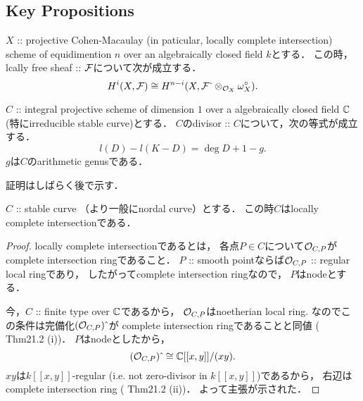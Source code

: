 \documentclass[a4paper]{jsarticle}
\newcommand{\dualsh}{\omega^{\circ}}
\begin{document}
    \subsection{Key Propositions}
    \begin{Thm} \label{thm:Hi_iso_Hn-i}
        $X$ :: projective Cohen-Macaulay (in paticular, locally complete intersection)
        scheme of equidimention $n$
        over an algebraically closed field $k$とする．
        この時，lcally free sheaf :: $\mathcal{F}$について次が成立する．
        \[ H^i(X, \shF) \iso H^{n-i}(X, \shF \sidecheck \otimes_{\shO_X} \dualsh_X). \]
    \end{Thm}

    \begin{Thm} \label{thm:RRforSingCurve}
        $C$ :: integral projective scheme of dimension $1$
        over a algebraically closed field $\mathbb{C}$
        (特にirreducible stable curve)とする．
        $C$のdivisor :: $C$について，次の等式が成立する．
        \[ l(D)-l(K-D)=\deg D+1-g. \]
        $g$は$C$のarithmetic genusである．
    \end{Thm}
    証明はしばらく後で示す．

    \begin{Lemma}
        $C$ :: stable curve （より一般にnordal curve）とする．
        この時$C$はlocally complete intersectionである．
    \end{Lemma}
    \begin{proof}
        locally complete intersectionであるとは，
        各点$P \in C$について$\mathcal{O}_{C, P}$がcomplete intersection ringであること．
        $P$ :: smooth pointならば$\mathcal{O}_{C, P}$ :: regular local ringであり，
        したがってcomplete intersection ringなので，
        $P$はnodeとする．

        今，$C$ :: finite type over $\mathbb{C}$であるから，
        $\mathcal{O}_{C, P}$はnoetherian local ring.
        なのでこの条件は完備化$(\mathcal{O}_{C, P})\,\hat{}\,$が
        complete intersection ringであることと同値
        (\cite{Mat} Thm21.2 (i))．
        $P$はnodeとしたから，
        \[ (\mathcal{O}_{C, P})\,\hat{}\, \cong \mathbb{C}[[x,y]]/(xy). \]
        $xy$は$k[[x,y]]$-regular (i.e. not zero-divisor in $k[[x,y]]$)であるから，
        右辺はcomplete intersection ring (\cite{Mat} Thm21.2 (ii))．
        よって主張が示された．
    \end{proof}
\end{document}
